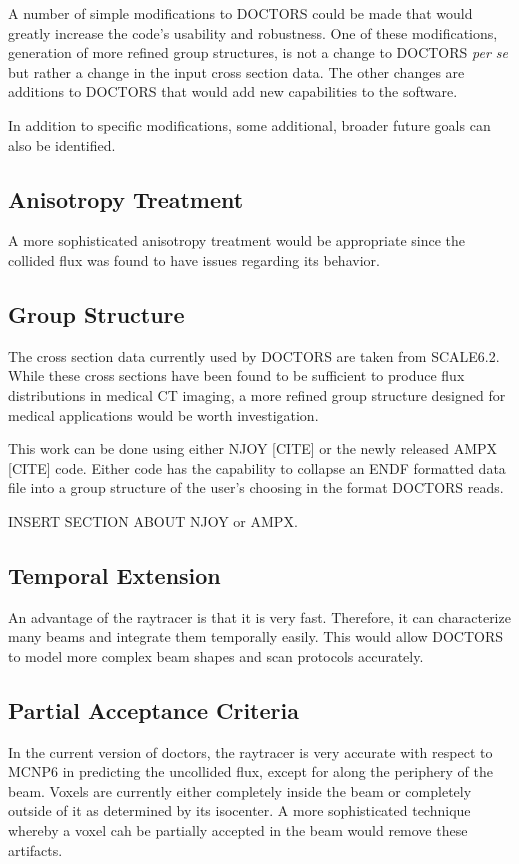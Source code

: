 A number of simple modifications to DOCTORS could be made that would greatly increase the code's usability and robustness. One of these modifications, generation of more refined group structures, is not a change to DOCTORS \textit{per se} but rather a change in the input cross section data. The other changes are additions to DOCTORS that would add new capabilities to the software.

In addition to specific modifications, some additional, broader future goals can also be identified.

\subsection{Anisotropy Treatment}
A more sophisticated anisotropy treatment would be appropriate since the collided flux was found to have issues regarding its behavior. 

\subsection{Group Structure}

The cross section data currently used by DOCTORS are taken from SCALE6.2. While these cross sections have been found to be sufficient to produce flux distributions in medical CT imaging, a more refined group structure designed for medical applications would be worth investigation.

This work can be done using either NJOY [CITE] or the newly released AMPX [CITE] code. Either code has the capability to collapse an ENDF formatted data file into a group structure of the user's choosing in the format DOCTORS reads.

INSERT SECTION ABOUT NJOY or AMPX.

\subsection{Temporal Extension}
An advantage of the raytracer is that it is very fast. Therefore, it can characterize many beams and integrate them temporally easily. This would allow DOCTORS to model more complex beam shapes and scan protocols accurately.

\subsection{Partial Acceptance Criteria}
In the current version of doctors, the raytracer is very accurate with respect to MCNP6 in predicting the uncollided flux, except for along the periphery of the beam. Voxels are currently either completely inside the beam or completely outside of it as determined by its isocenter. A more sophisticated technique whereby a voxel cah be partially accepted in the beam would remove these artifacts.

